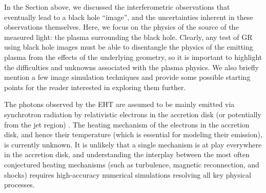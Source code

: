 \documentclass[graybox,envcountchap]{svmult}
\begin{document}
In the Section above, we discussed the interferometric observations that eventually lead to a black hole ``image'', and the uncertainties inherent in these observations themselves.
Here, we focus on the physics of the source of the measured light: the plasma surrounding the black hole.
Clearly, any test of GR using black hole images must be able to disentangle the physics of the emitting plasma from the effects of the underlying geometry, so it is important to highlight the difficulties and unknowns associated with the plasma physics.
We also briefly mention a few image simulation techniques and provide some possible starting points for the reader interested in exploring them further.

\bigskip

The photons observed by the EHT are assumed to be mainly emitted via synchrotron radiation by relativistic electrons in the accretion disk (or potentially from the jet region) \cite{EHT2019V,EHT2022V,Davelaar2023}.
The heating mechanism of the electrons in the accretion disk, and hence their temperature (which is essential for modeling their emission), is currently unknown.
It is unlikely that a single mechanism is at play everywhere in the accretion disk, and understanding the interplay between the most often conjectured heating mechanisms (such as turbulence, magnetic reconnection, and shocks) requires high-accuracy numerical simulations resolving all key physical processes. 
\end{document}
